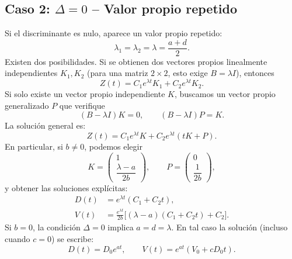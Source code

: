 \documentclass[10pt,letterpaper]{article}
\newcommand{\mat}[1]{\begin{pmatrix}#1\end{pmatrix}}
\begin{document}
\subsection{Caso 2: $\Delta=0$ -- Valor propio repetido}
Si el discriminante es nulo, aparece un valor propio repetido:
\begin{equation}\label{eq:lambda_rep}
\lambda_1=\lambda_2=\lambda=\frac{a+d}{2}.
\end{equation}
Existen dos posibilidades. Si se obtienen dos vectores propios linealmente independientes $K_1,K_2$ (para una matriz $2\times2$, esto exige $B=\lambda I$), entonces
\begin{equation}
Z(t)=C_1e^{\lambda t}K_1+C_2e^{\lambda t}K_2.
\end{equation}
Si solo existe un vector propio independiente $K$, buscamos un vector propio generalizado $P$ que verifique
\begin{equation}\label{eq:jordan}
(B-\lambda I)K=0,\qquad (B-\lambda I)P=K.
\end{equation}
La solución general es:
\begin{equation}\label{eq:rep_general}
\boxed{Z(t)=C_1e^{\lambda t}K+C_2e^{\lambda t}(tK+P).}
\end{equation}
En particular, si $b\ne0$, podemos elegir
\begin{equation}
K=\mat{1\\\dfrac{\lambda-a}{2b}},\qquad
P=\mat{0\\\dfrac{1}{2b}},
\end{equation}
y obtener las soluciones explícitas:
\begin{equation}\label{eq:rep_DV}
\boxed{\begin{aligned}
D(t)&=e^{\lambda t}(C_1+C_2t),\\
V(t)&=\frac{e^{\lambda t}}{2b}
\bigl[(\lambda-a)(C_1+C_2t)+C_2\bigr].
\end{aligned}}
\end{equation}
Si $b=0$, la condición $\Delta=0$ implica $a=d=\lambda$. En tal caso la solución (incluso cuando $c=0$) se escribe:
\begin{equation}\label{eq:b0rep}
D(t)=D_0e^{at},\qquad V(t)=e^{at}(V_0+cD_0t).
\end{equation}
\end{document}
